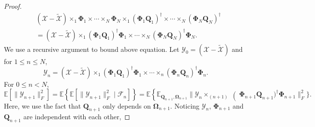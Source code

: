 \begin{lem}
\begin{proof}
\begin{equation}
\begin{aligned}
&(\mathscr{X} -  \tilde{\mathscr{X}})\times_1 \mathbf{\Phi}_1 \times \cdots \times_N \mathbf{\Phi}_N  \times_1 (\mathbf{\Phi}_1 \mathbf{Q}_1)^\dag \times \cdots \times_N (\mathbf{\Phi}_N \mathbf{Q}_N)^\dag \\
& =(\mathscr{X} -  \tilde{\mathscr{X}})\times_1 (\mathbf{\Phi}_1\mathbf{Q}_1)^\dag \mathbf{\Phi}_1 \times \cdots \times_N (\mathbf{\Phi}_N\mathbf{Q}_N)^\dag \mathbf{\Phi}_N.
\end{aligned}
\end{equation}
We use a recursive argument to bound above equation. Let 
$\mathscr{Y}_0 = (\mathscr{X} -  \tilde{\mathscr{X}})$ and for $1\le n \le N$, 
\begin{equation}
\mathscr{Y}_n =  (\mathscr{X} -  \tilde{\mathscr{X}})\times_1 (\mathbf{\Phi}_1\mathbf{Q}_1)^\dag \mathbf{\Phi}_1 \times \cdots \times_n (\mathbf{\Phi}_n\mathbf{Q}_n)^\dag \mathbf{\Phi}_n.
\end{equation}
For $0\le n<N$, 
\begin{equation}
\label{eq:recursion}
\mathbb{E} [\|\mathscr{Y}_{n+1}\|_F^2] = \mathbb{E}\left\{ \mathbb{E} [\|\mathscr{Y}_{n+1}\|_F^2 \mid \mathcal{F}_n] \right\} = \mathbb{E} \left\{\mathbb{E}_{\mathbf{Q}_{n+1}, \mathbf{\Omega}_{n+1}}  \|\mathscr{Y}_n\times_{(n+1)}\right (\mathbf{\Phi}_{n+1}\mathbf{Q}_{n+1})^\dag \mathbf{\Phi}_{n+1}\|_F^2\}. 
\end{equation}
Here, we use the fact that $\mathbf{Q}_{n+1}$ only depends on $\mathbf{\Omega}_{n+1}$. Noticing $\mathscr{Y}_n$, $\mathbf{\Phi}_{n+1}$ and $\mathbf{Q}_{n+1}$ are independent with each other, 


\end{proof}
\end{lem}
